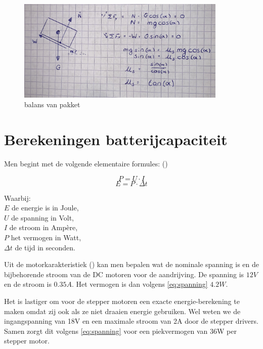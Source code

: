 \begin{figure}[H]
    \centering
    \includegraphics[width = 100mm]{06_Bijlage_H/balans_pakket.jpg}
    \caption{balans van pakket}
    \label{fig:balans_pakket}
\end{figure}

\section{Berekeningen batterijcapaciteit}

Men begint met de volgende elementaire formules: (\cite{giancoli_2014})

\begin{equation}
    P = U \cdot I
    \label{eq:spanning}
\end{equation}
\begin{equation}
    E = P \cdot \Delta t
    \label{eq:energie}
\end{equation}

Waarbij:\\
$E$ de energie is in Joule, \\
$U$ de spanning in Volt,         \\
$I$ de stroom in Ampère,         \\
$P$ het vermogen in Watt,        \\
$\Delta t$ de tijd in seconden. 

\vspace{\baselineskip}

Uit de motorkarakteristiek (\cite{motraxx-elektrogeraete-gmbh}) kan men bepalen wat de nominale spanning is en de bijbehorende stroom van de DC motoren voor de aandrijving. De spanning is $12 V$ en de stroom is $0.35 A$. Het vermogen is dan volgens \cref{eq:spanning} $4.2 W$.

Het is lastiger om voor de stepper motoren een exacte energie-berekening te maken omdat zij ook als ze niet draaien energie gebruiken. Wel weten we de ingangspanning van 18V en een maximale stroom van 2A door de stepper drivers. Samen zorgt dit volgens \cref{eq:spanning} voor een piekvermogen van 36W per stepper motor. 


